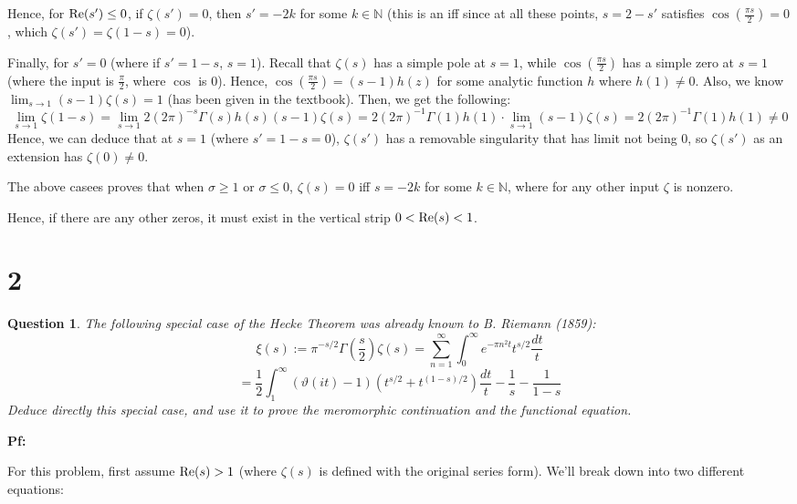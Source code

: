 \documentclass{article}
\newtheorem{question}{Question}
\begin{document}
Hence, for $\textmd{Re}(s')\leq 0$, if $\zeta(s')=0$, then $s' = -2k$ for some $k\in\mathbb{N}$ (this is an iff since at all these points, $s=2-s'$ satisfies $\cos(\frac{\pi s}{2})=0$, which $\zeta(s')=\zeta(1-s)=0$).

\hfil

Finally, for $s'=0$ (where if $s'=1-s$, $s=1$). Recall that $\zeta(s)$ has a simple pole at $s=1$, while $\cos(\frac{\pi s}{2})$ has a simple zero at $s=1$ (where the input is $\frac{\pi}{2}$, where $\cos$ is $0$). Hence, $\cos(\frac{\pi s}{2}) = (s-1)h(z)$ for some analytic function $h$ where $h(1)\neq 0$. Also, we know $\lim_{s\rightarrow 1}(s-1)\zeta(s) = 1$ (has been given in the textbook). Then, we get the following:
$$\lim_{s\rightarrow 1}\zeta(1-s) = \lim_{s\rightarrow 1}2(2\pi)^{-s}\Gamma(s)h(s)(s-1)\zeta(s) = 2(2\pi)^{-1}\Gamma(1)h(1)\cdot \lim_{s\rightarrow 1}(s-1)\zeta(s) = 2(2\pi)^{-1}\Gamma(1)h(1)\neq 0$$
Hence, we can deduce that at $s=1$ (where $s'=1-s=0$), $\zeta(s')$ has a removable singularity that has limit not being $0$, so $\zeta(s')$ as an extension has $\zeta(0)\neq 0$.

\hfil

The above casees proves that when $\sigma\geq 1$ or $\sigma\leq 0$, $\zeta(s)=0$ iff $s=-2k$ for some $k\in\mathbb{N}$, where for any other input $\zeta$ is nonzero.

Hence, if there are any other zeros, it must exist in the vertical strip $0<\textmd{Re}(s)<1$.

\break

\section*{2}
\begin{myBox}[]{}
    \begin{question}
        The following special case of the Hecke Theorem was already known to B. Riemann (1859):
        $$\xi(s):=\pi ^{-s/2}\Gamma\left(\frac{s}{2}\right)\zeta(s)=\sum_{n=1}^{\infty}\int_{0}^{\infty}e^{-\pi n^2t}t^{s/2}\frac{dt}{t}$$
        $$=\frac{1}{2}\int_{1}^{\infty}(\vartheta(it)-1)(t^{s/2}+t^{(1-s)/2})\frac{dt}{t}-\frac{1}{s}-\frac{1}{1-s}$$
        Deduce directly this special case, and use it to prove the meromorphic continuation and the functional equation.
    \end{question}
\end{myBox}

\textbf{Pf:}

For this problem, first assume $\textmd{Re}(s)>1$ (where $\zeta(s)$ is defined with the original series form). We'll break down into two different equations:
\end{document}
